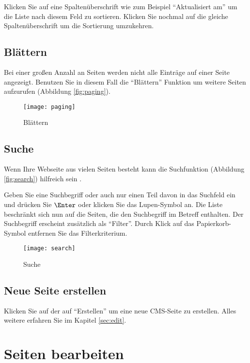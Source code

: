 \documentclass[article, a4paper, oneside, 11pt]{memoir}
\begin{document}
Klicken Sie auf eine Spaltenüberschrift wie zum Beispiel "`Aktualisiert am"' um die Liste nach diesem Feld zu sortieren. Klicken Sie nochmal auf die gleiche Spaltenüberschrift um die Sortierung umzukehren.


\section{Blättern}

Bei einer großen Anzahl an Seiten werden nicht alle Einträge auf einer Seite angezeigt. Benutzen Sie in diesem Fall die "`Blättern"' Funktion um weitere Seiten aufzurufen (Abbildung \vref{fig:paging}).

\begin{figure}[htp]
\centering
\texttt{[image: paging]}
\caption{Blättern}
\label{fig:paging}
\end{figure}


\section{Suche}

Wenn Ihre Webseite aus vielen Seiten besteht kann die Suchfunktion (Abbildung \vref{fig:search}) hilfreich sein .

Geben Sie eine Suchbegriff oder auch nur einen Teil davon in das Suchfeld ein und drücken Sie $\Enter$ oder klicken Sie das Lupen-Symbol an.
Die Liste beschränkt sich nun auf die Seiten, die den Suchbegriff im Betreff enthalten. Der Suchbegriff erscheint zusätzlich als "`Filter"'. Durch Klick auf das Papierkorb-Symbol entfernen Sie das Filterkriterium.

\begin{figure}[htp]
\centering
\texttt{[image: search]}
\caption{Suche}
\label{fig:search}
\end{figure}



\section{Neue Seite erstellen}

Klicken Sie auf der auf "`Erstellen"' um eine neue CMS-Seite zu erstellen. Alles weitere erfahren Sie im Kapitel \vref{sec:edit}.


\chapter{Seiten bearbeiten}
\label{sec:edit}
\end{document}
